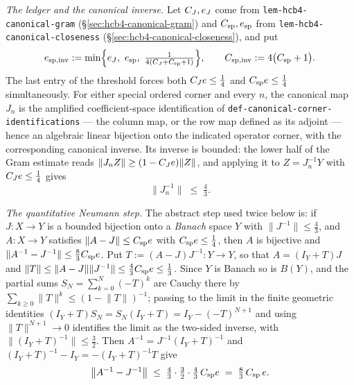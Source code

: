 \emph{The ledger and the canonical inverse.} Let $C_J,e_J$ come from
\texttt{lem-hcb4-canonical-gram} (\S\ref{sec:hcb4-canonical-gram}) and
$C_{\mathrm{sp}},e_{\mathrm{sp}}$ from \texttt{lem-hcb4-canonical-closeness}
(\S\ref{sec:hcb4-canonical-closeness}), and put
\begin{equation}\label{eq:ci-ledger}
  e_{\mathrm{sp,inv}}:=\min\Bigl\{e_J,\ e_{\mathrm{sp}},\
    \tfrac1{4(C_J+C_{\mathrm{sp}}+1)}\Bigr\},
  \qquad
  C_{\mathrm{sp,inv}}:=4\bigl(C_{\mathrm{sp}}+1\bigr).
\end{equation}
The last entry of the threshold forces both $C_Je\le\tfrac14$ and
$C_{\mathrm{sp}}e\le\tfrac14$ simultaneously. For either special ordered corner and
every $n$, the canonical map $J_n$ is the amplified coefficient-space identification of
\texttt{def-canonical-corner-identifications} --- the column map, or the row map defined as
its adjoint --- hence an algebraic linear bijection onto the indicated operator corner,
with the corresponding canonical inverse. Its inverse is bounded: the lower half of the
Gram estimate reads $\lVert J_nZ\rVert\ge(1-C_Je)\lVert Z\rVert$, and applying it to
$Z=J_n^{-1}Y$ with $C_Je\le\tfrac14$ gives
\begin{equation}\label{eq:ci-jinv}
  \bigl\lVert J_n^{-1}\bigr\rVert\;\le\;\tfrac43 .
\end{equation}

\emph{The quantitative Neumann step.} The abstract step used twice below is: if
$J:X\to Y$ is a bounded bijection onto a \emph{Banach} space $Y$ with
$\lVert J^{-1}\rVert\le\tfrac43$, and $A:X\to Y$ satisfies
$\lVert A-J\rVert\le C_{\mathrm{sp}}e$ with $C_{\mathrm{sp}}e\le\tfrac14$, then
$A$ is bijective and $\lVert A^{-1}-J^{-1}\rVert\le\tfrac83C_{\mathrm{sp}}e$. Put
$T:=(A-J)J^{-1}:Y\to Y$, so that $A=(I_Y+T)J$ and
$\lVert T\rVert\le\lVert A-J\rVert\lVert J^{-1}\rVert\le\tfrac43C_{\mathrm{sp}}e
\le\tfrac13$. Since $Y$ is Banach so is $B(Y)$, and the partial sums
$S_N=\sum_{k=0}^{N}(-T)^{k}$ are Cauchy there by
$\sum_{k\ge0}\lVert T\rVert^{k}\le(1-\lVert T\rVert)^{-1}$; passing to the limit in the
finite geometric identities $(I_Y+T)S_N=S_N(I_Y+T)=I_Y-(-T)^{N+1}$ and using
$\lVert T\rVert^{N+1}\to0$ identifies the limit as the two-sided inverse, with
$\lVert(I_Y+T)^{-1}\rVert\le\tfrac32$. Then $A^{-1}=J^{-1}(I_Y+T)^{-1}$ and
$(I_Y+T)^{-1}-I_Y=-(I_Y+T)^{-1}T$ give
\begin{equation}\label{eq:ci-neumann}
  \bigl\lVert A^{-1}-J^{-1}\bigr\rVert
  \;\le\;\tfrac43\cdot\tfrac32\cdot\tfrac43\,C_{\mathrm{sp}}e
  \;=\;\tfrac83\,C_{\mathrm{sp}}\,e .
\end{equation}

